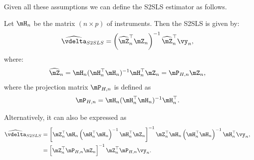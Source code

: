 \documentclass[english,12pt]{book}\usepackage[]{graphicx}\usepackage[]{xcolor}
\begin{document}
Given all these assumptions we can define the S2SLS estimator as follows.

\begin{definition}
Let $\mH_n$ be the matrix $(n\times p)$ of instruments. Then the S2SLS is given by:
\begin{equation}\label{eq:2sls_estimator}
  \widehat{\vdelta}_{S2SLS} =  \left(\widehat{\mZ}_n^\top\mZ_n\right)^{-1}\widehat{\mZ}^\top_n\vy_n,
\end{equation}
%
where:
\begin{equation}\label{eq:2sls_first_stage}
\widehat{\mZ}_n = \mH_n(\mH^\top_n\mH_n)^{-1}\mH^\top_n\mZ_n = \mP_{H, n}\mZ_n,
\end{equation}
%
where the projection matrix $\mP_{H, n}$ is defined as
\begin{equation}\label{eq:Phn}
\mP_{H, n}= \mH_n(\mH^\top_n\mH_n)^{-1}\mH^\top_n.
\end{equation}

Alternatively, it can also be expressed as
\begin{equation}\label{eq:2sls_first_stage2}
\begin{aligned}
\widehat{\vdelta}_{S2SLS}  & =\left[\mZ_n^\top \mH_n\left(\mH_n^\top\mH_n\right)^{-1}\mH_n^\top\mZ_n\right]^{-1}\mZ_n^\top \mH_n\left(\mH_n^\top\mH_n\right)^{-1}\mH_n^\top\vy_n, \\
 & = \left[\mZ_n^\top\mP_{H,n}\mZ_n\right]^{-1}\mZ_n^\top\mP_{H,n}\vy_n. 
\end{aligned}
\end{equation}
\end{definition}
\end{document}
